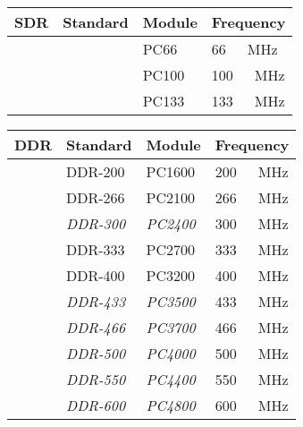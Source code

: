 \documentclass[a4paper]{article}
\newcommand{\mhz}[1]{\si{\num{#1}\ \mega\hertz}}
\begin{document}
	\thispagestyle{empty}
	\noindent
	\centering
	\begin{minipage}[t]{.4\textwidth}
		\raggedright
	\begin{table}[H]
		\def\arraystretch{2}
		\begin{tabular}{l l l l}
			SDR & Standard & Module & Frequency \\ \hline
			&          & PC66   & \mhz{66}  \\
			&          & PC100  & \mhz{100} \\
			&          & PC133  & \mhz{133} \\ \hline
			
		\end{tabular}
	\end{table}

	\begin{table}[H]
		\def\arraystretch{2}
		\begin{tabular}{l l l l}
			DDR & Standard         & Module          & Frequency \\ \hline
			& DDR-200          & PC1600          & \mhz{200} \\
			& DDR-266          & PC2100          & \mhz{266} \\
			& \textit{DDR-300} & \textit{PC2400} & \mhz{300} \\
			& DDR-333          & PC2700          & \mhz{333} \\
			& DDR-400          & PC3200          & \mhz{400} \\
			& \textit{DDR-433} & \textit{PC3500} & \mhz{433} \\
			& \textit{DDR-466} & \textit{PC3700} & \mhz{466} \\
			& \textit{DDR-500} & \textit{PC4000} & \mhz{500} \\
			& \textit{DDR-550} & \textit{PC4400} & \mhz{550} \\
			& \textit{DDR-600} & \textit{PC4800} & \mhz{600} \\ \hline
		\end{tabular}
	\end{table}
	\end{minipage}%
\end{document}

